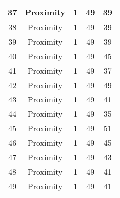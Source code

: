\documentclass[results.tex]{subfiles}
\begin{document}
\begin{center}
\begin{tabular}{| c || c | c | c | c |}
            \hline
            37                      & Proximity                    & 1                      & 49                      & 39                   \\
            \hline
            38                      & Proximity                    & 1                      & 49                      & 39                   \\
            \hline
            39                      & Proximity                    & 1                      & 49                      & 39                   \\
            \hline
            40                      & Proximity                    & 1                      & 49                      & 45                   \\
            \hline
            41                      & Proximity                    & 1                      & 49                      & 37                   \\
            \hline
            42                      & Proximity                    & 1                      & 49                      & 49                   \\
            \hline
            43                      & Proximity                    & 1                      & 49                      & 41                   \\
            \hline
            44                      & Proximity                    & 1                      & 49                      & 35                   \\
            \hline
            45                      & Proximity                    & 1                      & 49                      & 51                   \\
            \hline
            46                      & Proximity                    & 1                      & 49                      & 45                   \\
            \hline
            47                      & Proximity                    & 1                      & 49                      & 43                   \\
            \hline
            48                      & Proximity                    & 1                      & 49                      & 41                   \\
            \hline
            49                      & Proximity                    & 1                      & 49                      & 41                   \\
            \hline
        \end{tabular}
    \end{center}
\end{document}
